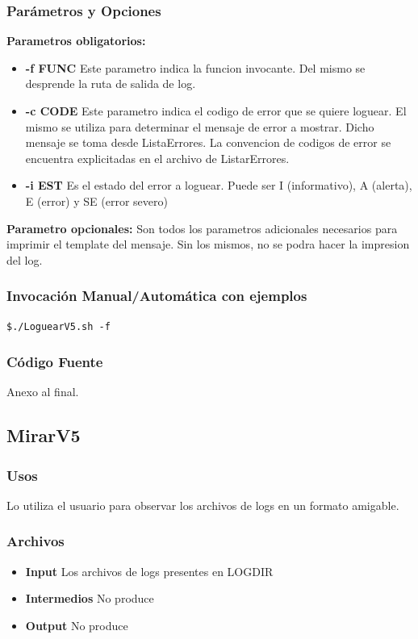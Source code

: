 \documentclass[a4paper,10pt,titlepage]{article}
\begin{document}
		\subsubsection{Par\'ametros y Opciones}
{\bf Parametros obligatorios:}
			\begin {itemize}
				\item \textbf{-f FUNC} {Este parametro indica la funcion invocante. Del mismo se desprende la ruta de salida de log.}
				\item \textbf{-c CODE} { Este parametro indica el codigo de error que se quiere loguear. El mismo se utiliza para determinar el mensaje de error a mostrar. Dicho mensaje se toma desde ListaErrores. La convencion de codigos de error se encuentra explicitadas en el archivo de ListarErrores.}
				\item \textbf{-i EST } {Es el estado del error a loguear. Puede ser I (informativo), A (alerta), E (error) y SE (error severo)}
			\end{itemize}

{\bf Parametro opcionales:} Son todos los parametros adicionales necesarios para imprimir el template del mensaje. Sin los mismos, no se podra hacer la impresion del log.
	
		\subsubsection{Invocaci\'on Manual/Autom\'atica con ejemplos}

\begin{verbatim}
$./LoguearV5.sh -f  
\end{verbatim}

		\subsubsection{C\'odigo Fuente}
			Anexo al final.


	\subsection{MirarV5}
		\subsubsection{Usos}

Lo utiliza el usuario para observar los archivos de logs en un formato amigable.
			 
		\subsubsection{Archivos}
			\begin {itemize}
				\item \textbf{Input} {Los archivos de logs presentes en LOGDIR}
				\item \textbf{Intermedios} {No produce}
				\item \textbf{Output} {No produce}
			\end{itemize}
\end{document}
